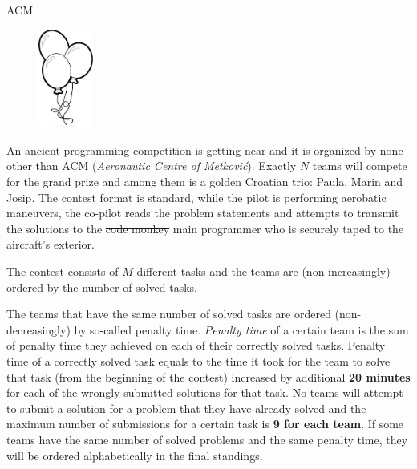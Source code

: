 \begin{statement}[
  problempoints=50,
  timelimit=1 second,
  memorylimit=512 MiB,
]{ACM}

\setlength\intextsep{-0.1cm}
\begin{figure}
\centering
\includegraphics[width=0.16\textwidth]{img/balloon.jpeg}
\end{figure}


An ancient programming competition is getting near and it is organized by
none other than ACM (\textit{Aeronautic Centre of Metković}). Exactly
$N$ teams will compete for the grand prize and among them is a golden
Croatian trio: Paula, Marin and Josip. The contest format is standard,
while the pilot is performing aerobatic maneuvers, the co-pilot reads the
problem statements and attempts to transmit the solutions to the
\sout{code monkey} main programmer who is securely taped to the aircraft's
exterior.

The contest consists of $M$ different tasks and the teams are (non-increasingly)
ordered by the number of solved tasks.


The teams that have the same number of solved tasks are ordered
(non-decreasingly) by so-called penalty time. \textit{Penalty time} of a
certain team is the sum of penalty time they achieved on each of
their correctly solved tasks.  Penalty time of a correctly solved task equals
to the time it took for the team to solve that task (from the beginning of
the contest) increased by additional \textbf{20 minutes} for each of the
wrongly submitted solutions for that task. No teams will attempt to submit a
solution for a problem that they have already solved and the maximum number
of submissions for a certain task is \textbf{9 for each team}.  If some teams
have the same number of solved problems and the same penalty time, they will
be ordered alphabetically in the final standings.


\end{statement}
